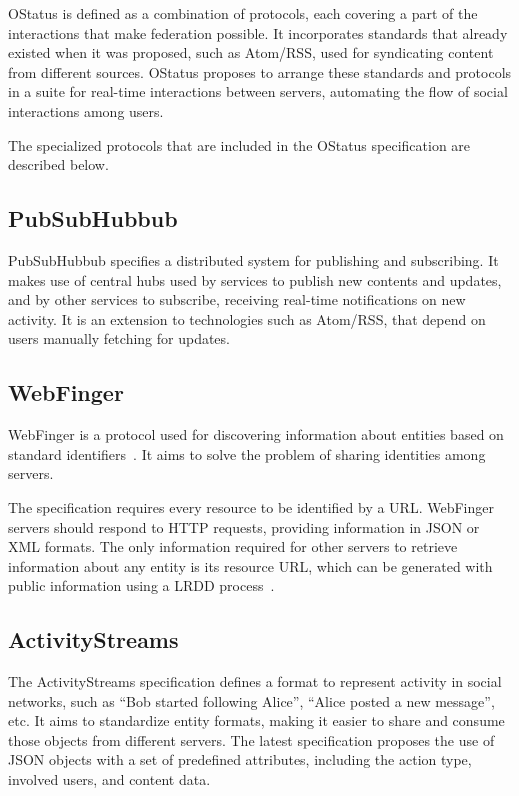 OStatus is defined as a combination of protocols, each covering a part
of the interactions that make federation possible. It incorporates
standards that already existed when it was proposed, such as Atom/RSS,
used for syndicating content from different sources.  OStatus proposes
to arrange these standards and protocols in a suite for real-time
interactions between servers, automating the flow of social interactions
among users.

The specialized protocols that are included in the OStatus specification
are described below.


\subsection{PubSubHubbub}

PubSubHubbub specifies a distributed system for publishing and
subscribing. It makes use of central hubs used by services to publish
new contents and updates, and by other services to subscribe, receiving
real-time notifications on new activity. It is an extension to
technologies such as Atom/RSS, that depend on users manually fetching
for updates.

\subsection{WebFinger}

WebFinger is a protocol used for discovering information about entities
based on standard identifiers~\cite{rfc7033}. It aims to solve the problem
of sharing identities among servers.

The specification requires every resource to be identified by a URL.
WebFinger servers should respond to HTTP requests, providing information
in JSON or XML formats. The only information required for other servers
to retrieve information about any entity is its resource URL, which can
be generated with public information using a LRDD process~\cite{lrdd2010}.

\subsection{ActivityStreams}

The ActivityStreams specification defines a format to represent activity
in social networks, such as ``Bob started following Alice'', ``Alice
posted a new message'', etc. It aims to standardize entity formats,
making it easier to share and consume those objects from different
servers. The latest specification proposes the use of JSON objects
with a set of predefined attributes, including the action type, involved
users, and content data.

